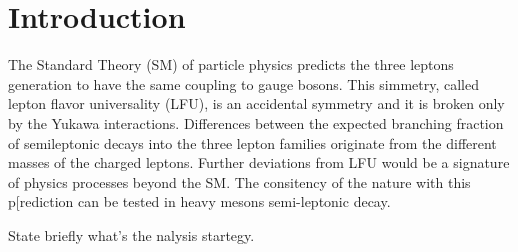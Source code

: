 \section{Introduction}
The Standard Theory (SM) of particle physics predicts the three leptons generation to have the same coupling to gauge bosons. This simmetry, called lepton flavor universality (LFU), is an accidental symmetry and it is broken only by the Yukawa interactions.
Differences between the expected branching fraction of semileptonic decays into the three lepton families originate from the different masses of the charged leptons. Further deviations from LFU would be a signature of physics processes beyond the SM.
The consitency of the nature with this p[rediction can be tested in heavy mesons semi-leptonic decay.

State briefly what's the nalysis startegy.
